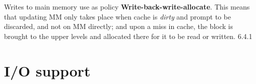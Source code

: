 Writes to main memory use as policy \textbf{ Write-back-write-allocate}. This means that updating MM only takes place when cache is \textit{dirty} and prompt to be discarded, and not on MM directly; and upon a miss in cache, the block is brought to the upper levels and allocated there for it to be read or written.
\cite{cortexA72manual} 6.4.1
\section{I/O support}